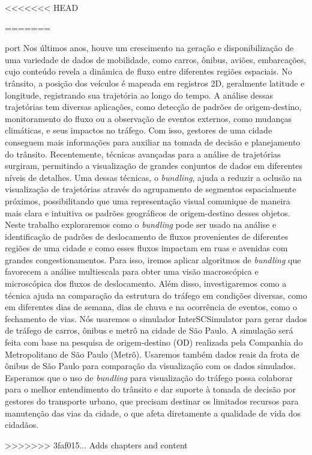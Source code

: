 <<<<<<< HEAD

=======
\begin{resumo}{port}
  Nos últimos anos, houve um crescimento na geração e disponibilização de uma
variedade de dados de mobilidade, como carros, ônibus, aviões, embarcações,
cujo conteúdo revela a dinâmica de fluxo entre diferentes regiões espaciais. No
trânsito, a posição dos veículos é mapeada em registros 2D, geralmente latitude
e longitude, registrando sua trajetória ao longo do tempo. A análise dessas
trajetórias tem diversas aplicações, como detecção de padrões de
origem-destino, monitoramento do fluxo ou a observação de eventos externos,
como mudanças climáticas, e seus impactos no tráfego. Com isso, gestores de uma
cidade conseguem mais informações para auxiliar na tomada de decisão e
planejamento do trânsito. Recentemente, técnicas avançadas para a análise de
trajetórias surgiram, permitindo a visualização de grandes conjuntos de dados
em diferentes níveis de detalhes. Uma dessas técnicas, o \emph{bundling},  ajuda a
reduzir a oclusão na visualização de trajetórias através do agrupamento de
segmentos espacialmente próximos, possibilitando que uma representação visual
comunique de maneira mais clara e intuitiva os padrões geográficos de
origem-destino desses objetos. Neste trabalho exploraremos como o \emph{bundling} pode
ser usado na análise e identificação de padrões de deslocamento de fluxos
provenientes de diferentes regiões de uma cidade e como esses fluxos impactam
em ruas e avenidas com grandes congestionamentos. Para isso, iremos aplicar
algoritmos de \emph{bundling} que favorecem a análise multiescala para obter uma
visão macroscópica e microscópica dos fluxos de deslocamento. Além disso,
investigaremos como a técnica ajuda na comparação da estrutura do tráfego em
condições diversas, como em diferentes dias de semana, dias de chuva e na
ocorrência de eventos, como o fechamento de vias. Nós usaremos o simulador
InterSCSimulator para gerar dados de tráfego de carros, ônibus e metrô na
cidade de São Paulo. A simulação será feita com base na pesquisa de
origem-destino (OD) realizada pela Companhia do Metropolitano de São Paulo
(Metrô). Usaremos também dados reais da frota de ônibus de São Paulo para
comparação da visualização com os dados simulados. Esperamos que o uso de
\emph{bundling} para visualização do tráfego possa colaborar  para o melhor
entendimento do trânsito e dar suporte à tomada de decisão por gestores do
transporte urbano, que precisam destinar os limitados recursos para manutenção
das vias da cidade, o que afeta diretamente a qualidade de vida dos cidadãos.
\end{resumo}
>>>>>>> 3faf015... Adds chapters and content

